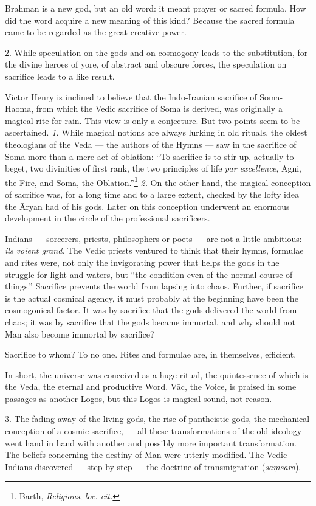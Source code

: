 \documentclass[a4paper, 11pt, oneside, english, landscape]{article}
\begin{document}
Brahman is a new god, but an old word: it meant prayer or sacred formula. How did the word acquire a new meaning of this kind? Because the sacred formula came to be regarded as the great creative power.

2. While speculation on the gods and on cosmogony leads to the substitution, for the divine heroes of yore, of abstract and obscure forces, the speculation on sacrifice leads to a like result.

Victor Henry is inclined to believe that the Indo-Iranian sacrifice of Soma-Haoma, from which the Vedic sacrifice of Soma is derived, was originally a magical rite for rain. This view is only a conjecture. But two points seem to be ascertained. \emph{1.} While magical notions are always lurking in old rituals, the oldest theologians of the Veda --- the authors of the Hymns --- saw in the sacrifice of Soma more than a mere act of oblation: ``To sacrifice is to stir up, actually to beget, two divinities of first rank, the two principles of life \emph{par excellence}, Agni, the Fire, and Soma, the Oblation.''\footnote{Barth, \emph{Religions}, \emph{loc. cit.}} \emph{2.} On the other hand, the magical conception of sacrifice was, for a long time and to a large extent, checked by the lofty idea the Āryan had of his gods. Later on this conception underwent an enormous development in the circle of the professional sacrificers.

Indians --- sorcerers, priests, philosophers or poets --- are not a little ambitious: \emph{ils voient grand}. The Vedic priests ventured to think that their hymns, formulae and rites were, not only the invigorating power that helps the gods in the struggle for light and waters, but ``the condition even of the normal course of things.'' Sacrifice prevents the world from lapsing into chaos. Further, if sacrifice is the actual cosmical agency, it must probably at the beginning have been the cosmogonical factor. It was by sacrifice that the gods delivered the world from chaos; it was by sacrifice that the gods became immortal, and why should not Man also become immortal by sacrifice?

Sacrifice to whom? To no one. Rites and formulae are, in themselves, efficient.

In short, the universe was conceived as a huge ritual, the quintessence of which is the Veda, the eternal and productive Word. Vāc, the Voice, is praised in some passages as another Logos, but this Logos is magical sound, not reason.

3. The fading away of the living gods, the rise of pantheistic gods, the mechanical conception of a cosmic sacrifice, --- all these transformations of the old ideology went hand in hand with another and possibly more important transformation. The beliefs concerning the destiny of Man were utterly modified. The Vedic Indians discovered --- step by step --- the doctrine of transmigration (\emph{saṃsāra}).
\end{document}
